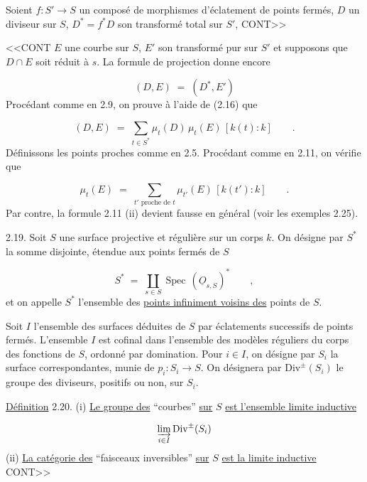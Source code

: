 Soient $f : S' \longrightarrow S$ un composé de morphismes d'éclatement de points fermés, $D$ un diviseur sur $S$, $D^* = f^* D$ son transformé total sur $S'$, CONT>>



<<CONT $E$ une courbe sur $S$, $E'$ son transformé pur sur $S'$ et supposons que $D \cap E$ soit réduit à $s$. La formule de projection donne encore

\begin{equation}\tag{2.16}
(D,E) \;=\; (D^*,E')
\end{equation}
Procédant comme en 2.9, on prouve à l'aide de (2.16) que

\begin{equation}\tag{2.17}
(D,E) \;=\; \sum_{t \in S^*} \mu_t(D) \, \mu_t(E) \, [k(t) : k] \qquad .
\end{equation}
Définissons les points proches comme en 2.5. Procédant comme en 2.11, on vérifie que

\begin{equation}\tag{2.18}
\mu_t(E) \;=\; \sum_{t' \text{ proche de } t} \mu_{t'}(E) \, [k(t') : k] \qquad .
\end{equation}
Par contre, la formule 2.11 (ii) devient fausse en général (voir les exemples 2.25).

2.19. Soit $S$ une surface projective et régulière sur un corps $k$. On désigne par $S^*$ la somme disjointe, étendue aux points fermés de $S$

\begin{equation*}
S^* \;=\; \coprod_{s \in S} \operatorname{Spec} \, (\underline{O}_{s,S})^* \qquad ,
\end{equation*}
et on appelle $S^*$ l'ensemble des \underline{points infiniment voisins des} points de $S$.

Soit $I$ l'ensemble des surfaces déduites de $S$ par éclatements successifs de points fermés. L'ensemble $I$ est cofinal dans l'ensemble des modèles réguliers du corps des fonctions de $S$, ordonné par domination. Pour $i \in I$, on désigne par $S_i$ la surface correspondantes, munie de $p_i : S_i \to S$. On désignera par $\mathrm{Div}^{\pm}(S_i)$ le groupe des diviseurs, positifs ou non, sur $S_i$.

\underline{Définition} 2.20. (i) \underline{Le groupe des} ``courbes'' \underline{sur} $S$ \underline{est l'ensemble limite inductive}

\begin{equation*}
\varinjlim_{i \in I} \mathrm{Div}^{\pm}(S_i)
\end{equation*}
(ii) \underline{La catégorie des} ``faisceaux inversibles'' \underline{sur} $S$ \underline{est la limite inductive} CONT>>


